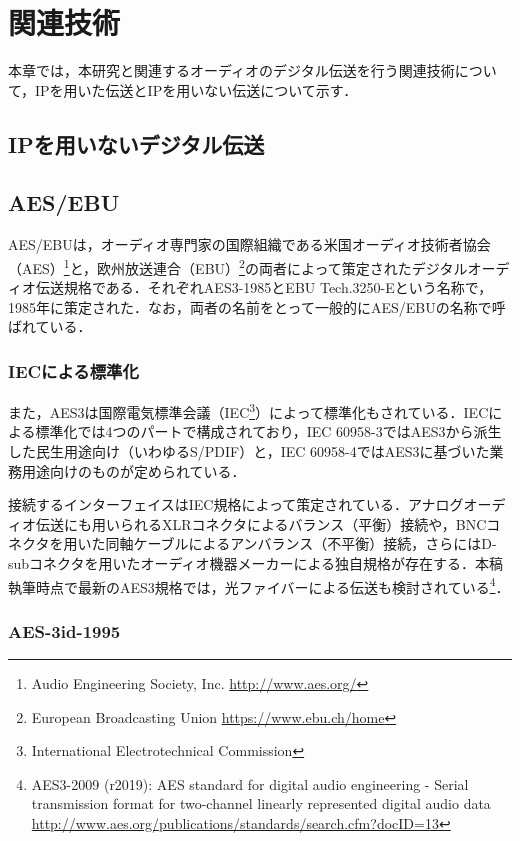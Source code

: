 \chapter{関連技術}
\label{chap:related_works}

本章では，本研究と関連するオーディオのデジタル伝送を行う関連技術について，IPを用いた伝送とIPを用いない伝送について示す．

\section*{IPを用いないデジタル伝送}

\section{AES/EBU}

AES/EBUは，オーディオ専門家の国際組織である米国オーディオ技術者協会（AES）\footnote{Audio Engineering Society, Inc. \url{http://www.aes.org/}}と，欧州放送連合（EBU）\footnote{European Broadcasting Union \url{https://www.ebu.ch/home}}の両者によって策定されたデジタルオーディオ伝送規格である．それぞれAES3-1985\cite{aes3-1985}とEBU Tech.3250-E\cite{ebutech-3250-e}という名称で，1985年に策定された．なお，両者の名前をとって一般的にAES/EBUの名称で呼ばれている．

\subsection{IECによる標準化}

また，AES3は国際電気標準会議（IEC\footnote{International Electrotechnical Commission}）によって標準化もされている．IECによる標準化では4つのパートで構成されており，IEC 60958-3ではAES3から派生した民生用途向け（いわゆるS/PDIF）と，IEC 60958-4ではAES3に基づいた業務用途向けのものが定められている．

接続するインターフェイスはIEC規格によって策定されている．アナログオーディオ伝送にも用いられるXLRコネクタによるバランス（平衡）接続や，BNCコネクタを用いた同軸ケーブルによるアンバランス（不平衡）接続，さらにはD-subコネクタを用いたオーディオ機器メーカーによる独自規格が存在する．本稿執筆時点で最新のAES3規格では，光ファイバーによる伝送も検討されている\footnote{AES3-2009 (r2019): AES standard for digital audio engineering - Serial transmission format for two-channel linearly represented digital audio data \url{http://www.aes.org/publications/standards/search.cfm?docID=13}}．

\subsection{AES-3id-1995}

